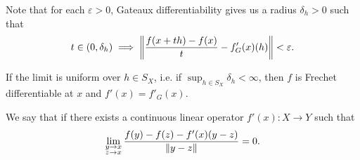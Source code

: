 \begin{definition}
\begin{defenum}
    Note that for each \( \varepsilon > 0 \), Gateaux differentiability gives us a radius \( \delta_h > 0 \) such that
    \begin{align*}
      t \in (0, \delta_h) \implies \left\Vert  \frac {f(x + th) - f(x)} t - f_G'(x)(h) \right\Vert < \varepsilon.
    \end{align*}

    If the limit is uniform over \( h \in S_X \), i.e. if \( \sup_{h \in S_X} \delta_h < \infty \), then \( f \) is Frechet differentiable at \( x \) and \( f'(x) = f'_G(x) \).

    \item\label{def:differentiability/strong}\cite[33]{Dontchev2014} We say that  if there exists a continuous linear operator \( f'(x): X \to Y \) such that
    \begin{align*}
      \lim_{\substack{y \to x \\ z \to x}} \frac{f(y) - f(z) - f'(x)(y - z)} {\left\Vert y - z \right\Vert} = 0.
    \end{align*}
  \end{defenum}
\end{definition}
